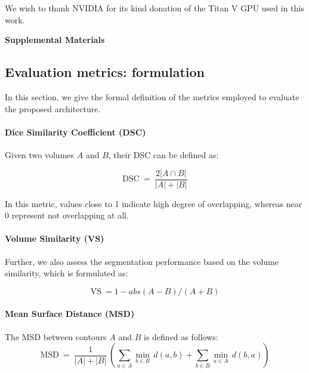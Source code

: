 \documentclass[journal]{IEEEtran}
\begin{document}
We wish to thank NVIDIA for its kind donation of the Titan V GPU used in this work.

%




\clearpage

\setcounter{page}{1}
\begin{center}
\textbf{\large Supplemental Materials}
\end{center}

\subsection*{\textbf{Evaluation metrics: formulation}}

In this section, we give the formal definition of the metrics employed to evaluate the proposed architecture.
\paragraph{\textbf{Dice Similarity Coefficient (DSC)}}
Given two volumes $A$ and $B$, their DSC can be defined as:

\begin{equation}
	\mathrm{DSC} \ = \ \dfrac{2\left|A \cap B \right|}{|A|+|B|}
\end{equation}

In this metric, values close to 1 indicate high degree of overlapping, whereas near 0 represent not overlapping at all. 
\paragraph{\textbf{Volume Similarity (VS)}} Further, we also assess the segmentation performance based on the volume similarity, which is formulated as:

\begin{equation}
	\mathrm{VS} \ = 1 - abs(A - B) / (A + B)
\end{equation}

\paragraph{\textbf{Mean Surface Distance (MSD)}} The MSD between contours $A$ and $B$ is defined as follows:
\begin{equation}
\mathrm{MSD} \ = \ \dfrac{1}{|A| + |B|} \, \left(\sum_{a \in A} \min_{b \in B} \, d(a,b) + \sum_{b \in B} \min_{a \in A} \, d(b,a) \right)
\end{equation}
\end{document}
